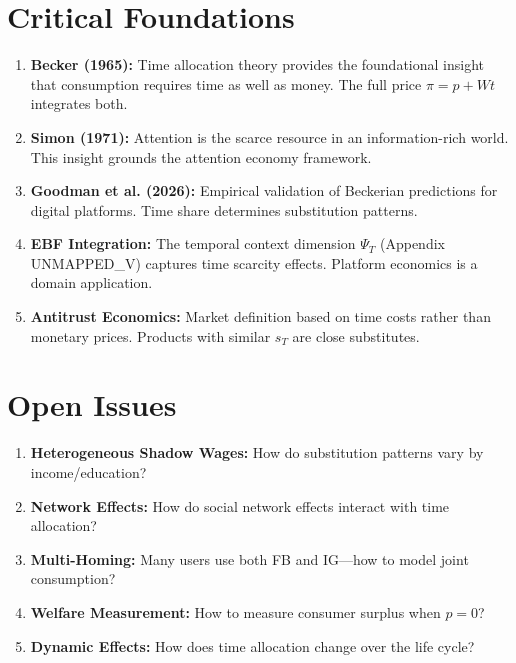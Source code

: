 \section{Critical Foundations}
\label{sec:pt-foundations}

\begin{enumerate}
\item \textbf{Becker (1965):} Time allocation theory provides the foundational insight that consumption requires time as well as money. The full price $\pi = p + Wt$ integrates both.

\item \textbf{Simon (1971):} Attention is the scarce resource in an information-rich world. This insight grounds the attention economy framework.

\item \textbf{Goodman et al. (2026):} Empirical validation of Beckerian predictions for digital platforms. Time share determines substitution patterns.

\item \textbf{EBF Integration:} The temporal context dimension $\Psi_T$ (Appendix UNMAPPED_V) captures time scarcity effects. Platform economics is a domain application.

\item \textbf{Antitrust Economics:} Market definition based on time costs rather than monetary prices. Products with similar $s_T$ are close substitutes.
\end{enumerate}

\section{Open Issues}
\label{sec:pt-open}

\begin{enumerate}
\item \textbf{Heterogeneous Shadow Wages:} How do substitution patterns vary by income/education?
\item \textbf{Network Effects:} How do social network effects interact with time allocation?
\item \textbf{Multi-Homing:} Many users use both FB and IG---how to model joint consumption?
\item \textbf{Welfare Measurement:} How to measure consumer surplus when $p=0$?
\item \textbf{Dynamic Effects:} How does time allocation change over the life cycle?
\end{enumerate}

